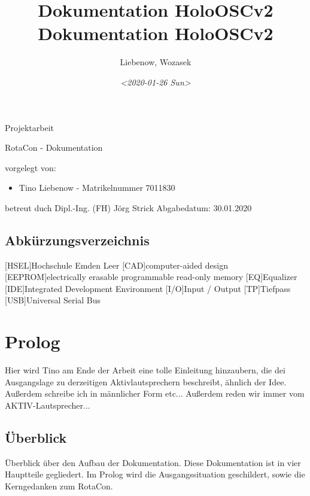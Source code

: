 \documentclass[11pt, titlepage, fleqn]{report}
\author{Liebenow, Wozasek}
\date{\textit{<2020-01-26 Sun>}}
\title{Dokumentation HoloOSCv2\\\medskip
\large Dokumentation HoloOSCv2}
\begin{document}
\begin{titlepage}%
	\hsellogo\hfill Projektarbeit %
	\par
	\vspace{4cm}
	\noindent\parbox{0.8\textwidth}{\Huge RotaCon - Dokumentation}  
	\vspace{2cm}

	\Large \noindent vorgelegt von:
	\begin{itemize}
		\item Tino Liebenow - Matrikelnummer 7011830
	\end{itemize}
	\vspace{2cm}
	betreut duch\newline
	Dipl.-Ing. (FH) Jörg Strick\newline
	Abgabedatum: 30.01.2020
\end{titlepage}
	\newpage
	\tableofcontents
	\listoffigures%
    \newpage
    \section*{\Huge Abkürzungsverzeichnis}%
    \label{sec:Abkürzungsverzeichnis}
    \vspace{1cm}
    \begin{acronym}
		{Hochschule Emden Leer}
		[CAD]{computer-aided design}
		[EEPROM]{electrically erasable programmable read-only memory}
		[EQ]{Equalizer}
		[IDE]{Integrated Development Environment}
		[I/O]{Input / Output}
		[TP]{Tiefpass}
		[USB]{Universal Serial Bus}
    \end{acronym}
	\newpage
	\chapter{Prolog}
		Hier wird Tino am Ende der Arbeit eine tolle Einleitung hinzaubern, die dei Ausgangslage zu derzeitigen Aktivlautsprechern
		beschreibt, ähnlich der Idee. Außerdem schreibe ich in männlicher Form etc...\newline
		Außerdem reden wir immer vom AKTIV-Lautsprecher...
	\section{Überblick}
		Überblick über den Aufbau der Dokumentation.\newline
		Diese Dokumentation ist in vier Hauptteile gegliedert. Im Prolog wird die Ausgangssituation geschildert, sowie die Kerngedanken zum RotaCon.
\end{document}

